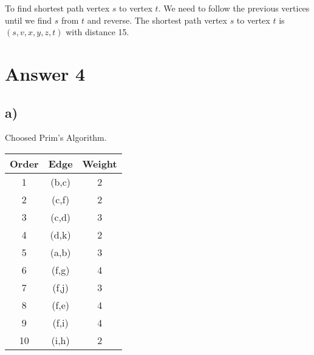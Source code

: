 \documentclass[12pt]{article}
\begin{document}
To find shortest path vertex $s$ to vertex $t$. We need to follow the previous vertices until we find $s$ from $t$ and reverse. 
The shortest path vertex $s$ to vertex $t$ is $(s,v,x,y,z,t)$ with distance 15.


\section*{Answer 4}
\subsection*{a)} Choosed Prim's Algorithm.
\begin{center}
        \begin{tabular}{|c|c|c|}
        \hline
        \textbf{Order} & \textbf{Edge} & \textbf{Weight}\\ \hline
        1 & (b,c) & 2 \\ \hline
        2 & (c,f) & 2 \\ \hline
        3 & (c,d) & 3 \\ \hline
        4 & (d,k) & 2 \\ \hline
        5 & (a,b) & 3 \\ \hline
        6 & (f,g) & 4 \\ \hline
        7 & (f,j) & 3 \\ \hline
        8 & (f,e) & 4 \\ \hline
        9 & (f,i) & 4 \\ \hline
        10 & (i,h) & 2 \\ \hline
        \end{tabular}
    \end{center}
\end{document}
